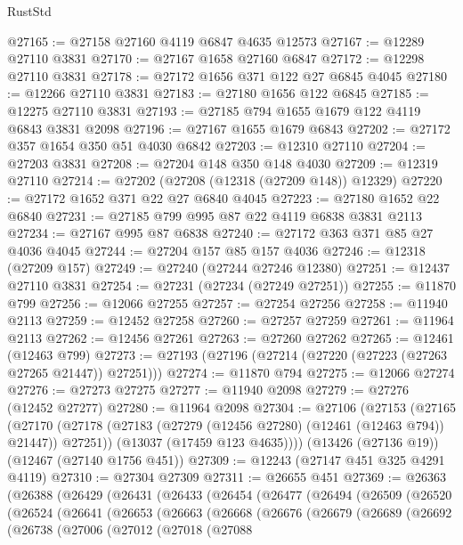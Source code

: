 \begin{lexlean}{RustStd}
\begin{coremodule}
@27165 := @27158 @27160 @4119 @6847 @4635 @12573
@27167 := @12289 @27110 @3831
@27170 := @27167 @1658 @27160 @6847
@27172 := @12298 @27110 @3831
@27178 := @27172 @1656 @371 @122 @27 @6845 @4045
@27180 := @12266 @27110 @3831
@27183 := @27180 @1656 @122 @6845
@27185 := @12275 @27110 @3831
@27193 := @27185 @794 @1655 @1679 @122 @4119 @6843 @3831 @2098
@27196 := @27167 @1655 @1679 @6843
@27202 := @27172 @357 @1654 @350 @51 @4030 @6842
@27203 := @12310 @27110
@27204 := @27203 @3831
@27208 := @27204 @148 @350 @148 @4030
@27209 := @12319 @27110
@27214 := @27202 (@27208 (@12318 (@27209 @148)) @12329)
@27220 := @27172 @1652 @371 @22 @27 @6840 @4045
@27223 := @27180 @1652 @22 @6840
@27231 := @27185 @799 @995 @87 @22 @4119 @6838 @3831 @2113
@27234 := @27167 @995 @87 @6838
@27240 := @27172 @363 @371 @85 @27 @4036 @4045
@27244 := @27204 @157 @85 @157 @4036
@27246 := @12318 (@27209 @157)
@27249 := @27240 (@27244 @27246 @12380)
@27251 := @12437 @27110 @3831
@27254 := @27231 (@27234 (@27249 @27251))
@27255 := @11870 @799
@27256 := @12066 @27255
@27257 := @27254 @27256
@27258 := @11940 @2113
@27259 := @12452 @27258
@27260 := @27257 @27259
@27261 := @11964 @2113
@27262 := @12456 @27261
@27263 := @27260 @27262
@27265 := @12461 (@12463 @799)
@27273 := @27193 (@27196 (@27214 (@27220 (@27223 (@27263 @27265 @21447)) @27251)))
@27274 := @11870 @794
@27275 := @12066 @27274
@27276 := @27273 @27275
@27277 := @11940 @2098
@27279 := @27276 (@12452 @27277)
@27280 := @11964 @2098
@27304 := @27106
    (@27153
      (@27165
        (@27170 (@27178 (@27183 (@27279 (@12456 @27280) (@12461 (@12463 @794)) @21447)) @27251))
        (@13037 (@17459 @123 @4635))))
    (@13426 (@27136 @19))
    (@12467 (@27140 @1756 @451))
@27309 := @12243 (@27147 @451 @325 @4291 @4119)
@27310 := @27304 @27309
@27311 := @26655 @451
@27369 := @26363
    (@26388
      (@26429
        (@26431
          (@26433
            (@26454
              (@26477
                (@26494
                  (@26509
                    (@26520
                      (@26524
                        (@26641
                          (@26653
                            (@26663
                              (@26668
                                (@26676
                                  (@26679
                                    (@26689
                                      (@26692
                                        (@26738
                                          (@27006
                                            (@27012
                                              (@27018
                                                (@27088

\end{coremodule}
\end{lexlean}
